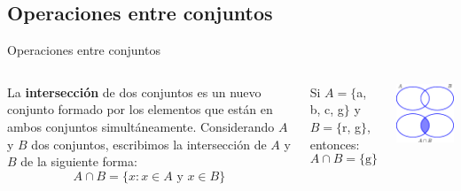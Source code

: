 \documentclass[9pt, aspectratio=169]{beamer}
\begin{document}
\subsection{Operaciones entre conjuntos}

\begin{frame}{Operaciones entre conjuntos}
\begin{columns}[c]
\cx
\begin{definition}
    La \textbf{intersección} de dos conjuntos es un nuevo conjunto formado por los elementos que están en ambos conjuntos simultáneamente. Considerando $A$ y $B$ dos conjuntos, escribimos la intersección de $A$ y $B$ de la siguiente forma:
    \[ A \cap B = \{ x : x \in A \text{ y } x \in B \} \]
\end{definition}

\begin{example}
    Si $A = \{$a, b, c, g$\}$ y $B = \{$r, g$\}$, entonces:
    \[ A \cap B = \{\text{g} \} \]
\end{example}

\cx
\begin{center}
    \includegraphics[scale=1.0]{figs/fig-03.pdf}
\end{center}
\end{columns}
\end{frame}
\end{document}
